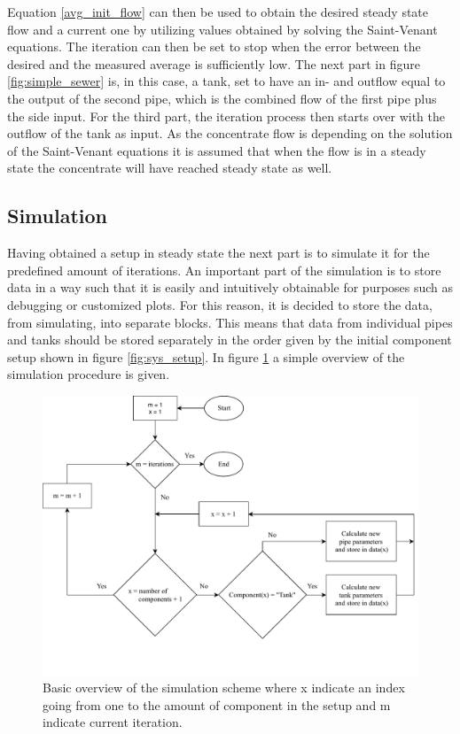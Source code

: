 Equation \ref{avg_init_flow} can then be used to obtain the desired steady state flow and a current one by utilizing values obtained by solving the Saint-Venant equations. The iteration can then be set to stop when the error between the desired and the measured average is sufficiently low. The next part in figure \ref {fig:simple_sewer} is, in this case, a tank, set to have an in- and outflow equal to the output of the second pipe, which is the combined flow of the first pipe plus the side input. For the third part, the iteration process then starts over with the outflow of the tank as input.
As the concentrate flow is depending on the solution of the Saint-Venant equations it is assumed that when the flow is in a steady state the concentrate will have reached steady state as well.

\subsection*{Simulation}

Having obtained a setup in steady state the next part is to simulate it for the predefined amount of iterations. An important part of the simulation is to store data in a way such that it is easily and intuitively obtainable for purposes such as debugging or customized plots. For this reason, it is decided to store the data, from simulating, into separate blocks. This means that data from individual pipes and tanks should be stored separately in the order given by the initial component setup shown in figure \ref{fig:sys_setup}. In figure \ref{fig:simple_simulation} a simple overview of the simulation procedure is given.   

\begin{figure}[H]
\centering
\includegraphics[width=1 \textwidth]{report/simulation/pictures/simple_simulation.pdf}
\caption{Basic overview of the simulation scheme where x indicate an index going from one to the amount of component in the setup and m indicate current iteration.}
\label{fig:simple_simulation}
\end{figure}

